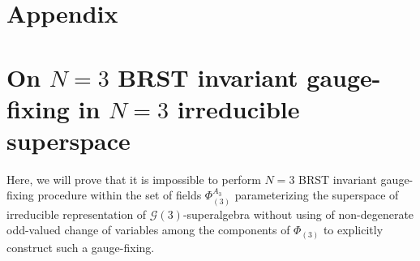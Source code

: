 \documentclass[10pt]{article}
\renewcommand{\theequation}{\thesection.\arabic{equation}}
\begin{document}
\appendix
\section*{Appendix}
\section{On $N=3$ BRST invariant gauge-fixing in $N=3$ irreducible superspace}\label{app1}

 \renewcommand{\theequation}{\Alph{section}.\arabic{equation}} \setcounter{equation}{0}

Here, we will prove that it is impossible to perform  $N=3$ BRST invariant gauge-fixing  procedure within the  set  of fields $\Phi^{A_3}_{(3)}$ parameterizing  the superspace of  irreducible  representation  of $\mathcal{G}(3)$-superalgebra without using of non-degenerate odd-valued change of variables among  the components of  $\Phi_{(3)}$ to explicitly construct such a gauge-fixing.
\end{document}

